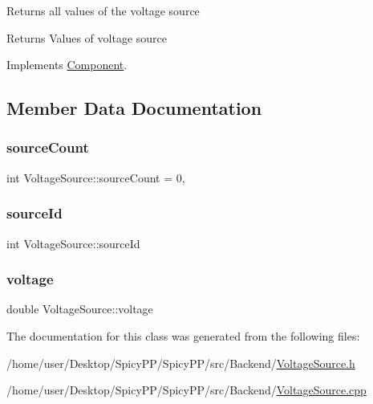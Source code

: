 Returns all values of the voltage source \begin{DoxyReturn}{Returns}
Values of voltage source 
\end{DoxyReturn}


Implements \hyperlink{classComponent_a7c6ba16177143bc9945583a9c3df4c89}{Component}.



\subsection{Member Data Documentation}
\mbox{\label{classVoltageSource_ade16a2431763eeff86ec7a4f842cf6f0}} 
\subsubsection{\texorpdfstring{source\+Count}{sourceCount}}
{\footnotesize\ttfamily int Voltage\+Source\+::source\+Count = 0\hspace{0.3cm}{\ttfamily [static]}, {\ttfamily [private]}}

\mbox{\label{classVoltageSource_a34411acea2cb7d017e1b5c0b826d69a6}} 
\subsubsection{\texorpdfstring{source\+Id}{sourceId}}
{\footnotesize\ttfamily int Voltage\+Source\+::source\+Id\hspace{0.3cm}{\ttfamily [private]}}

\mbox{\label{classVoltageSource_a1bd00b28cadd7f5b0faa58fd33bceee9}} 
\subsubsection{\texorpdfstring{voltage}{voltage}}
{\footnotesize\ttfamily double Voltage\+Source\+::voltage\hspace{0.3cm}{\ttfamily [private]}}



The documentation for this class was generated from the following files\+:\begin{DoxyCompactItemize}
\item 
/home/user/\+Desktop/\+Spicy\+P\+P/\+Spicy\+P\+P/src/\+Backend/\hyperlink{VoltageSource_8h}{Voltage\+Source.\+h}\item 
/home/user/\+Desktop/\+Spicy\+P\+P/\+Spicy\+P\+P/src/\+Backend/\hyperlink{VoltageSource_8cpp}{Voltage\+Source.\+cpp}\end{DoxyCompactItemize}
